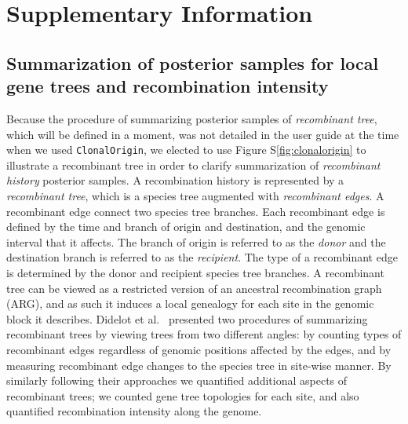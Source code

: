 \documentclass[10pt]{article}
\let\citet\cite
\begin{document}




\section{Supplementary Information}

\subsection{Summarization of posterior samples for local gene trees and recombination intensity}

Because the procedure of summarizing posterior samples of \textit{recombinant
tree}, which will be defined in a moment, was not detailed in the user guide at
the time when we used \texttt{ClonalOrigin}, we elected to use Figure
S\ref{fig:clonalorigin} to illustrate a recombinant tree in order to clarify
summarization of \textit{recombinant history} posterior samples.  A
recombination history is represented by a \textit{recombinant tree}, which is a
species tree augmented with \textit{recombinant edges}.  A recombinant edge
connect two species tree branches.  Each recombinant edge is defined by the time
and branch of origin and destination, and the genomic interval that it affects.
The branch of origin is referred to as the \textit{donor} and the destination
branch is referred to as the \textit{recipient}. The type of a recombinant edge
is determined by the donor and recipient species tree branches.  A recombinant
tree can be viewed as a restricted version of an ancestral recombination graph
(ARG), and as such it induces a local genealogy for each site in the genomic
block it describes.  Didelot et al.\ \citet{Didelot2010} presented two procedures of summarizing
recombinant trees by viewing trees from two different angles: by counting types
of recombinant edges regardless of genomic positions affected by the edges, and
by measuring recombinant edge changes to the species tree in site-wise manner.
By similarly following their approaches we quantified additional aspects of
recombinant trees; we counted gene tree topologies for each site, and also
quantified recombination intensity along the genome.
\end{document}
